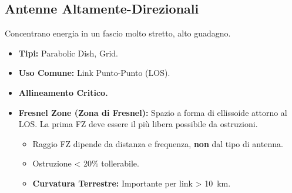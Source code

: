 \subsection{Antenne Altamente-Direzionali}
Concentrano energia in un fascio molto stretto, alto guadagno.
\begin{itemize}
    \item \textbf{Tipi:} Parabolic Dish, Grid.
    \item \textbf{Uso Comune:} Link Punto-Punto (LOS).
    \item \textbf{Allineamento Critico.}
    \item \textbf{Fresnel Zone (Zona di Fresnel):} Spazio a forma di ellissoide attorno al LOS. La prima FZ deve essere il più libera possibile da ostruzioni.
    \begin{itemize}
        \item Raggio FZ dipende da distanza e frequenza, \textbf{non} dal tipo di antenna.
        \item Ostruzione < 20\% tollerabile.
        \item \textbf{Curvatura Terrestre:} Importante per link > \SI{10}{\kilo\meter}.
    \end{itemize}
\end{itemize}
